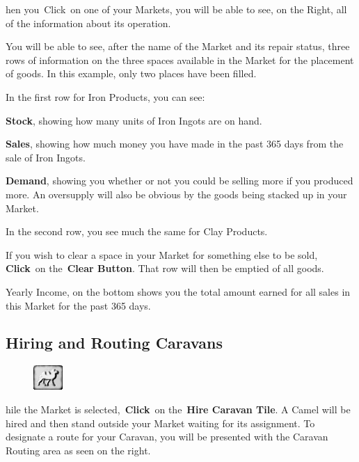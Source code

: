 hen you Click on one of your Markets, you will be able to see, on the Right, all of the information about its operation.

You will be able to see, after the name of the Market and its repair status, three rows of information on the three spaces available in the Market for the placement of goods. In this example, only two places have been filled.

In the first row for Iron Products, you can see:


\textbf{Stock}, showing how many units of Iron Ingots are on hand.

\textbf{Sales}, showing how much money you have made in the past 365 days from the sale of Iron Ingots.

\textbf{Demand}, showing you whether or not you could be selling more if you produced more. An oversupply will also be obvious by the goods being stacked up in your Market.

In the second row, you see much the same for Clay Products.

If you wish to clear a space in your Market for something else to be sold, \textbf{Click} on the \textbf{Clear Button}. That row will then be emptied of all goods.


Yearly Income, on the bottom shows you the total amount earned for all sales in this Market for the past 365 days.

\subsection{Hiring and Routing Caravans}

\begin{figure}
	\vspace{-20pt}
	\begin{center}
		\includegraphics[width=0.1\textwidth]{Tcamel}
	\end{center}
	\vspace{-20pt}
\end{figure}


hile the Market is selected, \textbf{Click} on the \textbf{Hire Caravan Tile}. A Camel will be hired and then stand outside your Market waiting for its assignment. To designate a route for your Caravan, you will be presented with the Caravan Routing area as seen on the right.

